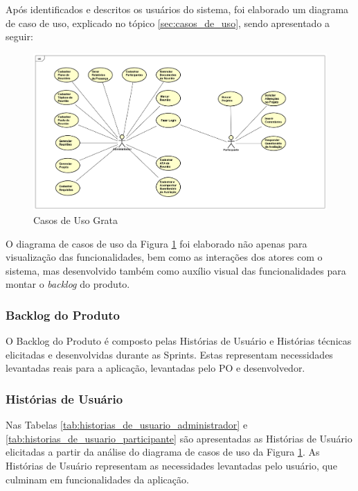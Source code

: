 Após identificados e descritos os usuários do sistema, foi elaborado um diagrama de caso de uso, explicado no tópico \ref{sec:casos_de_uso}, sendo apresentado a seguir:

\begin{figure}[H]
	\centering
	\includegraphics[width=1.0\textwidth]{figuras/casosDeUso.png}
	\caption{Casos de Uso Grata}
	\label{img:casos_de_uso_grata}
\end{figure}

O diagrama de casos de uso da Figura \ref{img:casos_de_uso_grata} foi elaborado não apenas para visualização das funcionalidades, bem como as interações dos atores com o sistema, mas desenvolvido também como auxílio visual das funcionalidades para montar o \textit{backlog} do produto.

\subsubsection{Backlog do Produto}

O Backlog do Produto é composto pelas Histórias de Usuário e Histórias técnicas
elicitadas e desenvolvidas durante as Sprints. Estas representam necessidades levantadas reais para a aplicação, levantadas pelo PO e desenvolvedor.

\subsubsection{Histórias de Usuário}

Nas Tabelas \ref{tab:historias_de_usuario_administrador} e \ref{tab:historias_de_usuario_participante} são apresentadas as Histórias de Usuário elicitadas a partir da análise do diagrama de casos de uso da Figura \ref{img:casos_de_uso_grata}. 
As Histórias de Usuário representam as necessidades levantadas pelo usuário, que culminam em funcionalidades da aplicação. 

